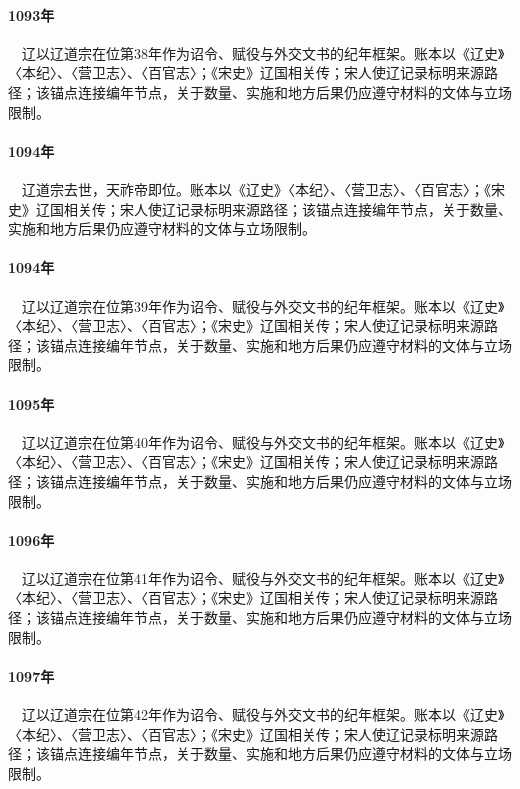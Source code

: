 \paragraph{1093年}　辽以辽道宗在位第38年作为诏令、赋役与外交文书的纪年框架。账本以《辽史》〈本纪〉、〈营卫志〉、〈百官志〉；《宋史》辽国相关传；宋人使辽记录标明来源路径；该锚点连接编年节点，关于数量、实施和地方后果仍应遵守材料的文体与立场限制。

\paragraph{1094年}　辽道宗去世，天祚帝即位。账本以《辽史》〈本纪〉、〈营卫志〉、〈百官志〉；《宋史》辽国相关传；宋人使辽记录标明来源路径；该锚点连接编年节点，关于数量、实施和地方后果仍应遵守材料的文体与立场限制。

\paragraph{1094年}　辽以辽道宗在位第39年作为诏令、赋役与外交文书的纪年框架。账本以《辽史》〈本纪〉、〈营卫志〉、〈百官志〉；《宋史》辽国相关传；宋人使辽记录标明来源路径；该锚点连接编年节点，关于数量、实施和地方后果仍应遵守材料的文体与立场限制。

\paragraph{1095年}　辽以辽道宗在位第40年作为诏令、赋役与外交文书的纪年框架。账本以《辽史》〈本纪〉、〈营卫志〉、〈百官志〉；《宋史》辽国相关传；宋人使辽记录标明来源路径；该锚点连接编年节点，关于数量、实施和地方后果仍应遵守材料的文体与立场限制。

\paragraph{1096年}　辽以辽道宗在位第41年作为诏令、赋役与外交文书的纪年框架。账本以《辽史》〈本纪〉、〈营卫志〉、〈百官志〉；《宋史》辽国相关传；宋人使辽记录标明来源路径；该锚点连接编年节点，关于数量、实施和地方后果仍应遵守材料的文体与立场限制。

\paragraph{1097年}　辽以辽道宗在位第42年作为诏令、赋役与外交文书的纪年框架。账本以《辽史》〈本纪〉、〈营卫志〉、〈百官志〉；《宋史》辽国相关传；宋人使辽记录标明来源路径；该锚点连接编年节点，关于数量、实施和地方后果仍应遵守材料的文体与立场限制。

